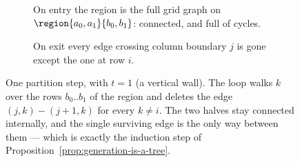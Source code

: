 \begin{figure}[htbp]
  \centering
  \begin{subfigure}[b]{0.47\textwidth}\centering
    \caption{On entry the region is the full grid graph on
    $\region{a_0,a_1}{b_0,b_1}$: connected, and full of cycles.}
    \label{fig:partition-before}
  \end{subfigure}\hfill
  \begin{subfigure}[b]{0.47\textwidth}\centering
    \caption{On exit every edge crossing column boundary $j$ is gone except the
    one at row $i$.}
    \label{fig:partition-after}
  \end{subfigure}
  \caption{One partition step, with $t=1$ (a vertical wall). The loop walks
  $k$ over the rows $b_0..b_1$ of the region and deletes the edge
  $(j,k)\!-\!(j{+}1,k)$ for every $k\neq i$. The two halves stay connected
  internally, and the single surviving edge is the only way between them ---
  which is exactly the induction step of
  Proposition~\ref{prop:generation-is-a-tree}.}
  \label{fig:one-partition-step}
\end{figure}
